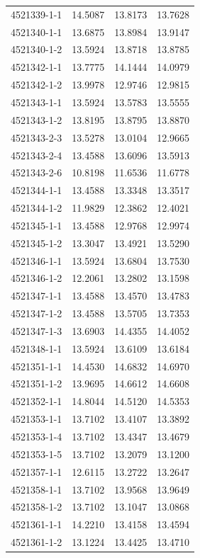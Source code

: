 \begin{longtable}{lrrr}
4521339-1-1 & 14.5087 & 13.8173 & 13.7628 \\
4521340-1-1 & 13.6875 & 13.8984 & 13.9147 \\
4521340-1-2 & 13.5924 & 13.8718 & 13.8785 \\
4521342-1-1 & 13.7775 & 14.1444 & 14.0979 \\
4521342-1-2 & 13.9978 & 12.9746 & 12.9815 \\
4521343-1-1 & 13.5924 & 13.5783 & 13.5555 \\
4521343-1-2 & 13.8195 & 13.8795 & 13.8870 \\
4521343-2-3 & 13.5278 & 13.0104 & 12.9665 \\
4521343-2-4 & 13.4588 & 13.6096 & 13.5913 \\
4521343-2-6 & 10.8198 & 11.6536 & 11.6778 \\
4521344-1-1 & 13.4588 & 13.3348 & 13.3517 \\
4521344-1-2 & 11.9829 & 12.3862 & 12.4021 \\
4521345-1-1 & 13.4588 & 12.9768 & 12.9974 \\
4521345-1-2 & 13.3047 & 13.4921 & 13.5290 \\
4521346-1-1 & 13.5924 & 13.6804 & 13.7530 \\
4521346-1-2 & 12.2061 & 13.2802 & 13.1598 \\
4521347-1-1 & 13.4588 & 13.4570 & 13.4783 \\
4521347-1-2 & 13.4588 & 13.5705 & 13.7353 \\
4521347-1-3 & 13.6903 & 14.4355 & 14.4052 \\
4521348-1-1 & 13.5924 & 13.6109 & 13.6184 \\
4521351-1-1 & 14.4530 & 14.6832 & 14.6970 \\
4521351-1-2 & 13.9695 & 14.6612 & 14.6608 \\
4521352-1-1 & 14.8044 & 14.5120 & 14.5353 \\
4521353-1-1 & 13.7102 & 13.4107 & 13.3892 \\
4521353-1-4 & 13.7102 & 13.4347 & 13.4679 \\
4521353-1-5 & 13.7102 & 13.2079 & 13.1200 \\
4521357-1-1 & 12.6115 & 13.2722 & 13.2647 \\
4521358-1-1 & 13.7102 & 13.9568 & 13.9649 \\
4521358-1-2 & 13.7102 & 13.1047 & 13.0868 \\
4521361-1-1 & 14.2210 & 13.4158 & 13.4594 \\
4521361-1-2 & 13.1224 & 13.4425 & 13.4710 \\

\end{longtable}
